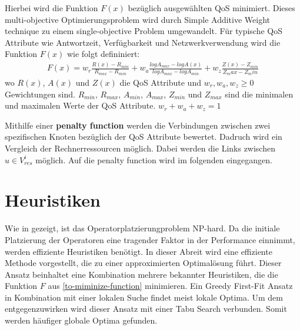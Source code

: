 \documentclass{article}
\begin{document}
Hierbei wird die Funktion $F(x)$ bezüglich ausgewählten QoS minimiert. Dieses multi-objective Optimierungsproblem wird durch 
Simple Additive Weight technique \cite{yoon-multiple-optimization} zu einem single-objective Problem umgewandelt.
Für typische QoS Attribute wie Antwortzeit, Verfügbarkeit und Netzwerkverwendung \cite{efficient-operator-placement} wird die Funktion $F(x)$ wie folgt defininiert:
\[ 
    \begin{gathered}
        F(x) = w_r \frac{R(x) - R_{min}}{R_{max} - R_{min}} 
        + w_a \frac{log A_{max} - log A(x)}{log A_{max} - log A_{min}} 
        + w_z \frac{Z(x) - Z_{min}}{Z_max - Z_min} 
    \end{gathered}  \label{to-miminize-function}
\] 
wo $R(x)$, $A(x)$ und $Z(x)$ die QoS Attribute und $w_r, w_a, w_z \geq 0$ Gewichtungen sind. $R_{min}$, $R_{max}$, $A_{min}$, $A_{max}$, $Z_{min}$ und $Z_{max}$ sind die minimalen und maximalen Werte der QoS Attribute.
$w_r + w_a + w_z = 1$




Mithilfe einer \textbf{penalty function} werden die  Verbindungen zwischen zwei spezifischen Knoten bezüglich der QoS Attribute bewertet. Dadruch wird ein Vergleich 
der Rechnerressourcen möglich. Dabei werden die Links zwischen $u \in V_{res}^i$ möglich. Auf die penalty function wird im folgenden eingegangen.




\section{Heuristiken} \label{Heurisiken}
Wie in \cite{cardellini-optimal_operatorplc} gezeigt, ist das 
Operatorplatzierungproblem NP-hard.
Da die initiale Platzierung der Operatoren eine tragender Faktor
in der Performance einnimmt, werden effiziente Heuristiken benötigt. 
In dieser Abreit wird eine effiziente Methode vorgestellt, die 
zu einer approximierten Optimalösung führt. 
Dieser Ansatz beinhaltet eine Kombination mehrere bekannter Heuristiken, die die Funktion $F$ aus \ref{to-miminize-function} minimieren.  
Ein Greedy First-Fit Ansatz in Kombination mit einer lokalen Suche findet meist lokale Optima. 
Um dem entgegenzuwirken wird dieser Ansatz mit einer Tabu Search verbunden. 
Somit werden häufiger \cite{efficient-operator-placement} globale Optima gefunden. 
\end{document}
